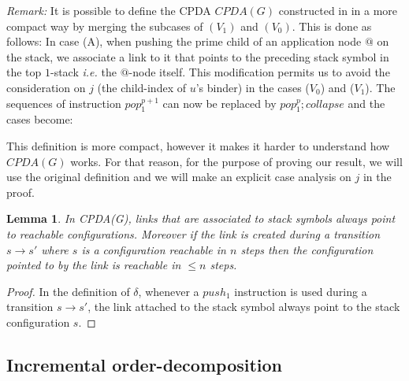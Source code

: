 \documentclass{article}
\newtheorem{lemma}{Lemma}[section]
\theoremstyle{remark}
\theoremstyle{definition}
\begin{document}
{\it Remark:} It is possible to define the
CPDA $CPDA(G)$ constructed in \cite{hague-sto07} in a more compact way by
merging the subcases of $(V_1)$ and $(V_0)$. This is done as follows: In case (A), when pushing the prime child of an application node $@$ on the stack, we associate a link to it that points to the preceding stack symbol in the top $1$-stack {\it i.e.} the $@$-node itself.
 This modification permits us to avoid the consideration on $j$ (the child-index of $u$'s binder) in the
 cases ($V_0$) and ($V_1$). The sequences of instruction $pop_1^{p+1}$ can now be replaced by
 $pop_1^p ; collapse$ and the cases become:
 \bigskip
\begin{center}
\end{center}
This definition is more compact, however it makes it harder to
understand how $CPDA(G)$ works. For that reason, for the purpose of
proving our result, we will use the original definition and we will
make an explicit case analysis on $j$ in the proof.


\begin{lemma}
  \label{lem:links_pointto_reachable}
In CPDA(G), links that are associated to stack symbols always point
to reachable configurations. Moreover if the link is created during
a transition $s\rightarrow s'$ where $s$ is a configuration
reachable in $n$ steps then the configuration pointed to by the link
is reachable in $\leq n$ steps.
\end{lemma}
\begin{proof}
  In the definition of $\delta$, whenever a $push_1$ instruction is used during a transition $s \rightarrow s'$,
the link attached to the stack symbol always point to the stack
configuration $s$.
\end{proof}


\subsection{Incremental order-decomposition}
\end{document}
